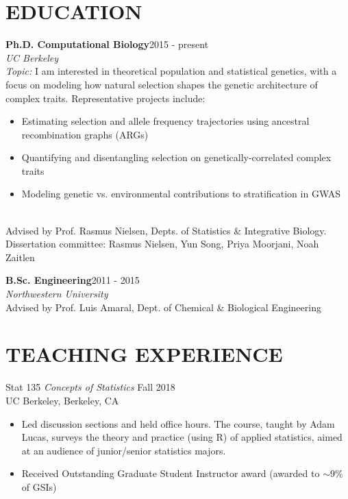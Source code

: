 \documentclass[margin, 10pt]{res} %
\begin{document}
\begin{resume}

 
\section{EDUCATION}  
{\bf Ph.D. Computational Biology}\hfill 2015 - present\\
{\sl UC Berkeley}\\
{\sl Topic:} I am interested in theoretical population and statistical genetics, with a focus on modeling how natural selection shapes the genetic architecture of complex traits. Representative projects include:
\begin{itemize}
	\item Estimating selection and allele frequency trajectories using ancestral recombination graphs (ARGs)
	\item Quantifying and disentangling selection on genetically-correlated complex traits
	\item Modeling genetic vs. environmental contributions to stratification in GWAS 
\end{itemize}

\vspace{0.1cm}\\
Advised by Prof. Rasmus Nielsen, Depts. of Statistics \& Integrative Biology.\\
Dissertation committee: Rasmus Nielsen, Yun Song, Priya Moorjani, Noah Zaitlen 

{\bf B.Sc. Engineering}\hfill 2011 - 2015\\
{\sl Northwestern University}\\
Advised by Prof. Luis Amaral, Dept. of Chemical \& Biological Engineering

\section{TEACHING EXPERIENCE}
 Stat 135 {\sl Concepts of Statistics}  \hfill Fall 2018\\
UC Berkeley, Berkeley, CA\\
\begin{itemize}
\item[] Led discussion sections and held office hours. The course, taught by Adam Lucas, surveys the theory and practice (using R) of applied statistics, aimed at an audience of junior/senior statistics majors. 
\item[] Received Outstanding Graduate Student Instructor award (awarded to $\sim$9\% of GSIs)
\end{itemize} 


\end{resume}
\end{document}
